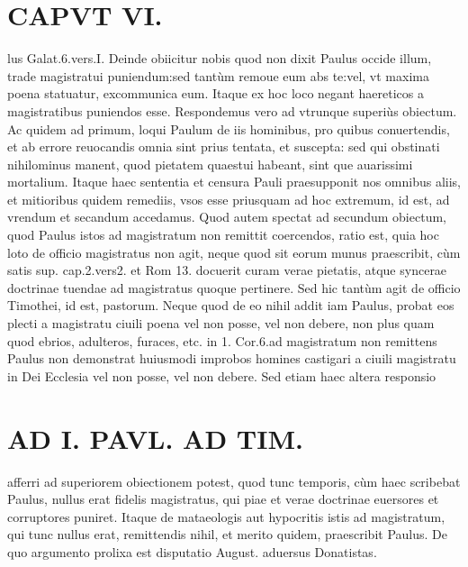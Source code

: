 \documentclass{article}
\begin{document}
\begin{pages}
\section*{CAPVT  VI. }
\marginpar{[ p.433 ]}\pstart lus Galat.6.vers.I.  \pend\pstart Deinde obiicitur nobis quod non dixit Paulus occide illum, trade magistratui puniendum:sed tantùm remoue eum abs te:vel, vt maxima poena statuatur, excommunica eum. Itaque ex hoc loco negant haereticos a magistratibus puniendos esse. Respondemus vero ad vtrunque superiùs obiectum. Ac quidem ad primum, loqui Paulum de iis hominibus, pro quibus conuertendis, et ab errore reuocandis omnia sint prius tentata, et suscepta: sed qui obstinati nihilominus manent, quod pietatem quaestui habeant, sint que auarissimi mortalium. Itaque haec sententia et censura Pauli praesupponit nos omnibus aliis, et mitioribus quidem remediis, vsos esse priusquam ad hoc extremum, id est, ad vrendum et secandum accedamus.  \pend\pstart Quod autem spectat ad secundum obiectum, quod Paulus istos ad magistratum non remittit coercendos, ratio est, quia hoc loto de officio magistratus non agit, neque quod sit eorum munus praescribit, cùm satis sup. cap.2.vers2. et Rom 13. docuerit curam verae pietatis, atque syncerae doctrinae tuendae ad magistratus quoque pertinere. Sed hic tantùm agit de officio Timothei, id est, pastorum. Neque quod de eo nihil addit iam Paulus, probat eos plecti a magistratu ciuili poena vel non posse, vel non debere, non plus quam quod ebrios, adulteros, furaces, etc. in 1. Cor.6.ad magistratum non remittens Paulus non demonstrat huiusmodi improbos homines castigari a ciuili magistratu in Dei Ecclesia vel non posse, vel non debere. Sed etiam haec altera responsio  \pend
\section*{AD I. PAVL. AD TIM. }
\marginpar{[ p.150 ]}\pstart afferri ad superiorem obiectionem potest, quod tunc temporis, cùm haec scribebat Paulus, nullus erat fidelis magistratus, qui piae et verae doctrinae euersores et corruptores puniret. Itaque  de mataeologis aut hypocritis istis ad magistratum, qui tunc nullus erat, remittendis nihil, et merito quidem, praescribit Paulus. De quo argumento prolixa est disputatio August. aduersus Donatistas.  \pend
{}
{}

\end{pages}
\end{document}
